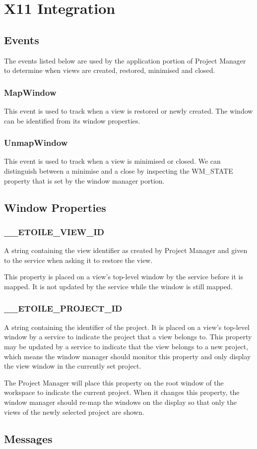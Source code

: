 \documentclass[11pt]{report}
\newcommand{\proman}{Project Manager\xspace}
\begin{document}
\section{X11 Integration}
\label{sec:x11_integration}
\subsection{Events}
The events listed below are used by the application portion of \proman to determine when views are created, restored, minimised and closed.
\subsubsection{MapWindow}
This event is used to track when a view is restored or newly created. The window can be identified from its window properties.
\subsubsection{UnmapWindow}
This event is used to track when a view is minimised or closed. We can distinguish between a minimise and a close by inspecting the WM\_STATE property that is set by the window manager portion.

\subsection{Window Properties}
\subsubsection{\_\_ETOILE\_VIEW\_ID}
A string containing the view identifier as created by \proman and given to the service when asking it to restore the view. 

This property is placed on a view's top-level window by the service before it is mapped. It is not updated by the service while the window is still mapped.

\subsubsection{\_\_ETOILE\_PROJECT\_ID}
A string containing the identifier of the project. It is placed on a view's top-level window by a service to indicate the project that a view belongs to. This property may be updated by a service to indicate that the view belongs to a new project, which means the window manager should monitor this property and only display the view window in the currently set project.

The \proman will place this property on the root window of the workspace to indicate the current project. When it changes this property, the window manager should re-map the windows on the display so that only the views of the newly selected project are shown.

\subsection{Messages}
\end{document}
